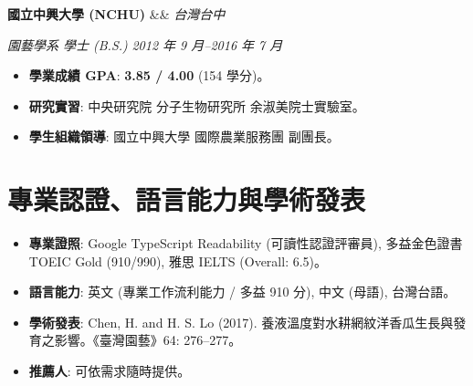 \documentclass[10pt,a4paper]{article}
\newcommand{\entryheader}[3]{%
  \noindent%
  \textbf{\color{maindark}#1}%
  \ifx&#2&%
  \else%
    { \small\color{subgray}#2}%
  \fi%
  \hfill%
  \textit{\color{locationcoral}#3}\par%
}
\newcommand{\entrysubheader}[2]{%
  \noindent%
  \textit{\color{subgray}#1}%
  \hfill%
  \textit{\color{subgray}#2}\par%
  \vspace{1.5pt}%
}
\begin{document}
\vspace{3pt}

\entryheader{國立中興大學 (NCHU)}{}{台灣台中}
\entrysubheader{園藝學系 學士 (B.S.)}{2012 年 9 月--2016 年 7 月}
\begin{itemize}
    \item \textbf{學業成績 GPA}: \textbf{3.85 / 4.00} (154 學分)。
    \item \textbf{研究實習}: 中央研究院 分子生物研究所 余淑美院士實驗室。
    \item \textbf{學生組織領導}: 國立中興大學 國際農業服務團 副團長。
\end{itemize}

\section{專業認證、語言能力與學術發表}
\begin{itemize}
    \item \textbf{專業證照}: Google TypeScript Readability (可讀性認證評審員), 多益金色證書 TOEIC Gold (910/990), 雅思 IELTS (Overall: 6.5)。
    \item \textbf{語言能力}: 英文 (專業工作流利能力 / 多益 910 分), 中文 (母語), 台灣台語。
    \item \textbf{學術發表}: Chen, H. and H. S. Lo (2017). 養液溫度對水耕網紋洋香瓜生長與發育之影響。《臺灣園藝》64: 276--277。
    \item \textbf{推薦人}: 可依需求隨時提供。
\end{itemize}
\end{document}
